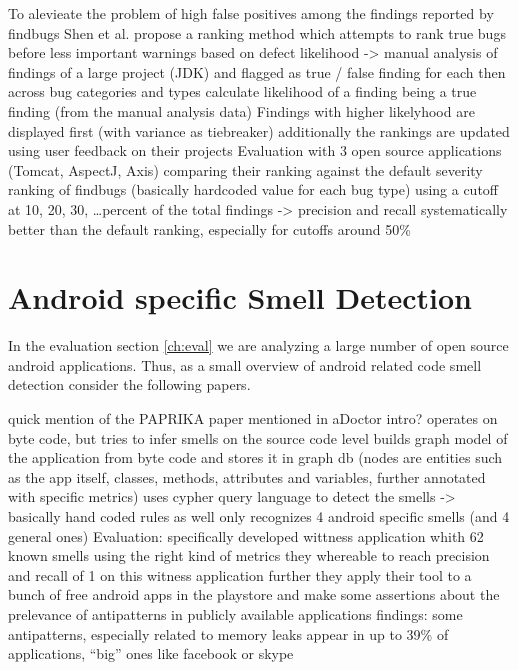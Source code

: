 To alevieate the problem of high false positives among the findings reported by findbugs
Shen et al. \cite{shen2011efindbugs} propose a ranking method which attempts to rank true bugs before less important warnings
based on defect likelihood -> manual analysis of findings of a large project (JDK) and flagged as true / false finding for each
then across bug categories and types calculate likelihood of a finding being a true finding (from the manual analysis data)
Findings with higher likelyhood are displayed first (with variance as tiebreaker)
additionally the rankings are updated using user feedback on their projects
Evaluation with 3 open source applications (Tomcat, AspectJ, Axis)
comparing their ranking against the default severity ranking of findbugs (basically hardcoded value for each bug type)
using a cutoff at 10, 20, 30, \ldots percent of the total findings
-> precision and recall systematically better than the default ranking, especially for cutoffs around 50\%


\section{Android specific Smell Detection}

In the evaluation section \ref{ch:eval} we are analyzing a large number of open source android applications.
Thus, as a small overview of android related code smell detection consider the following papers.

quick mention of the PAPRIKA paper mentioned in aDoctor intro? \cite{hecht2015detecting}
    operates on byte code, but tries to infer smells on the source code level
    builds graph model of the application from byte code and stores it in graph db (nodes are entities such as the app itself, classes, methods, attributes and variables, further annotated with specific metrics)
    uses cypher query language to detect the smells -> basically hand coded rules as well
    only recognizes 4 android specific smells (and 4 general ones)
    Evaluation: specifically developed wittness application whith 62 known smells
    using the right kind of metrics they whereable to reach precision and recall of 1 on this witness application
    further they apply their tool to a bunch of free android apps in the playstore and make some assertions about the prelevance of antipatterns in publicly available applications
    findings: some antipatterns, especially related to memory leaks appear in up to 39\% of applications, ``big'' ones like facebook or skype

